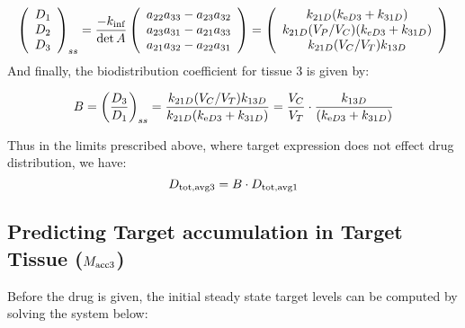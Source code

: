 \[
\left(\begin{array}{c}
D_{1}\\
D_{2}\\
D_{3}
\end{array}\right)_{ss}=\frac{-k_{\text{inf}}}{\det A}\left(\begin{array}{c}
a_{22}a_{33}-a_{23}a_{32}\\
a_{23}a_{31}-a_{21}a_{33}\\
a_{21}a_{32}-a_{22}a_{31}
\end{array}\right)=\left(\begin{array}{c}
k_{21D}(k_{\text{e} D3}+k_{31D})\\
k_{21D}(V_{P}/V_{C})(k_{eD3}+k_{31D})\\
k_{21D}(V_{C}/V_{T})k_{13D}
\end{array}\right)
\]
And finally, the biodistribution coefficient for tissue 3 is given
by:

\[
B=\left(\frac{D_{3}}{D_{1}}\right)_{ss}=\frac{k_{21D}(V_{C}/V_{T})k_{13D}}{k_{21D}(k_{\text{e} D3}+k_{31D})}=\frac{V_{C}}{V_{T}}\cdot\frac{k_{13D}}{(k_{\text{e} D3}+k_{31D})}
\]

Thus in the limits prescribed above, where target expression does
not effect drug distribution, we have:
\[
D_{\text{tot},\text{avg}3}=B\cdot D_{\text{tot},\text{avg}1}
\]

\subsection{Predicting Target accumulation in Target Tissue ($M_{\text{acc}3}$)}

Before the drug is given, the initial steady state target levels can
be computed by solving the system below:

